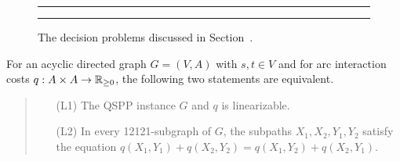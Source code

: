 \documentclass[11pt,fleqn]{article}
\begin{document}
\begin{figure}[tb]
\begin{center}

\bigskip
\bigskip
\end{center}
\caption{The decision problems discussed in Section~\protect{\ref{sec:hardness}}.}
\label{fig:problems}
\medskip
\hrule\hrule
\end{figure}

\begin{proposition}
\label{pr:HS}
For an acyclic directed graph $G=(V,A)$ with $s,t\in V$ and for arc interaction
costs $q:A\times A\to{\mathbb{R}_{\ge0}}$, the following two statements are equivalent.
\begin{quote}
\begin{itemize}
\item[(L1)] The QSPP instance $G$ and $q$ is linearizable.
\item[(L2)] In every 12121-subgraph of $G$, the subpaths $X_1,X_2,Y_1,Y_2$ satisfy the equation
$q(X_1,Y_1)+q(X_2,Y_2) = q(X_1,Y_2)+q(X_2,Y_1)$.
\end{itemize}
\end{quote}
\end{proposition}
\end{document}
